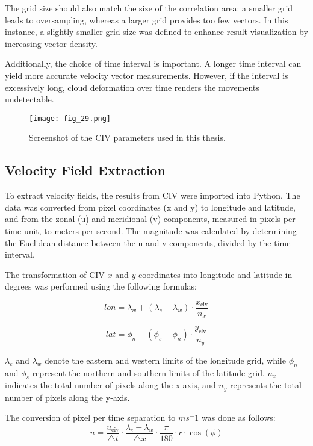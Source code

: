The grid size should also match the size of the correlation area: a smaller grid leads to oversampling, whereas a larger grid provides too few vectors. In this instance, a slightly smaller grid size was defined to enhance result visualization by increasing vector density.

Additionally, the choice of time interval is important. A longer time interval can yield more accurate velocity vector measurements. However, if the interval is excessively long, cloud deformation over time renders the movements undetectable.
\FloatBarrier
\begin{figure}[h!] 
    \centering
    \texttt{[image: fig\_29.png]}
    \caption{Screenshot of the CIV parameters used in this thesis.}
\end{figure}
\FloatBarrier
\subsection{Velocity Field Extraction}

To extract velocity fields, the results from CIV were imported into Python. The data was converted from pixel coordinates (x and y) to longitude and latitude, and from the zonal (u) and meridional (v) components, measured in pixels per time unit, to meters per second. The magnitude was calculated by determining the Euclidean distance between the u and v components, divided by the time interval. 

The transformation of CIV \( x\) and \( y\) coordinates into longitude and latitude in degrees was performed using the following formulas\cite{AlBlooki2023}: 

\begin{equation}
lon = \lambda_w + (\lambda_e - \lambda_w) \cdot \frac{x_{\text{civ}}}{n_x}
\end{equation}

\begin{equation}
lat = \phi_n + (\phi_s - \phi_n) \cdot \frac{y_{\text{civ}}}{n_y}
\end{equation}

\( \lambda_e\) and \( \lambda_w\) denote the eastern and western limits of the longitude grid, while \( \phi_n\) and \( \phi_s\) represent the northern and southern limits of the latitude grid. \( n_x\) indicates the total number of pixels along the x-axis, and \( n_y\) represents the total number of pixels along the y-axis.

The conversion of pixel per time separation to \( m s^-1\) was done as follows:
\begin{equation}
u = \frac{u_{\text{civ}}}{\triangle t} \cdot \frac{\lambda_e - \lambda_w}{\triangle x} \cdot \frac{\pi}{180} \cdot r \cdot \cos(\phi)
\end{equation}

